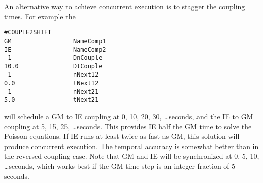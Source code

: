 An alternative way to achieve concurrent execution is to
stagger the coupling times. For example the
\begin{verbatim}
#COUPLE2SHIFT
GM                 NameComp1
IE                 NameComp2
-1                 DnCouple
10.0               DtCouple
-1                 nNext12
0.0                tNext12
-1                 nNext21
5.0                tNext21
\end{verbatim}
will schedule a GM to IE coupling at 0, 10, 20, 30, \ldots seconds,
and the IE to GM coupling at 5, 15, 25, \ldots seconds.
This provides IE half the GM time to solve the Poisson equations.
If IE runs at least twice as fast as GM, this solution will
produce concurrent execution. The temporal accuracy is
somewhat better than in the reversed coupling case.
Note that GM and IE will be synchronized at 0, 5, 10, \ldots seconds,
which works best if the GM time step is an integer fraction of 5 seconds.
